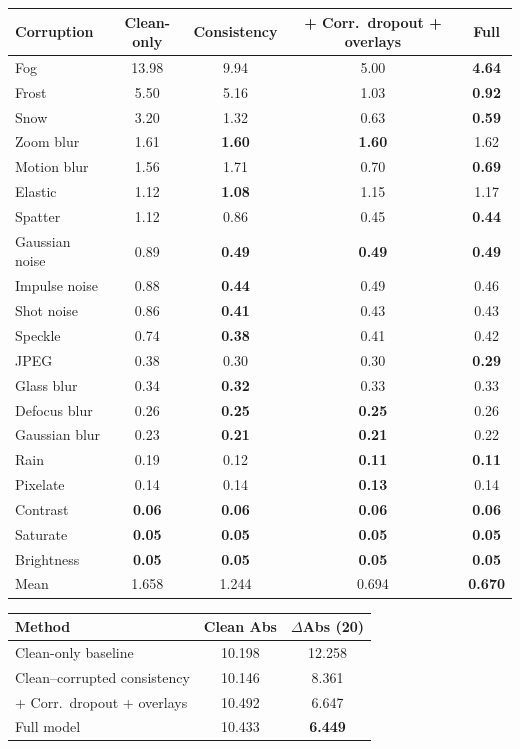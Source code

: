 \begin{tabular}{lcccc}
\toprule
Corruption & Clean-only & Consistency & + Corr.\ dropout + overlays & Full \\
\midrule
Fog & 13.98 & 9.94 & 5.00 & \textbf{4.64} \\
Frost & 5.50 & 5.16 & 1.03 & \textbf{0.92} \\
Snow & 3.20 & 1.32 & 0.63 & \textbf{0.59} \\
Zoom blur & 1.61 & \textbf{1.60} & \textbf{1.60} & 1.62 \\
Motion blur & 1.56 & 1.71 & 0.70 & \textbf{0.69} \\
Elastic & 1.12 & \textbf{1.08} & 1.15 & 1.17 \\
Spatter & 1.12 & 0.86 & 0.45 & \textbf{0.44} \\
Gaussian noise & 0.89 & \textbf{0.49} & \textbf{0.49} & \textbf{0.49} \\
Impulse noise & 0.88 & \textbf{0.44} & 0.49 & 0.46 \\
Shot noise & 0.86 & \textbf{0.41} & 0.43 & 0.43 \\
Speckle & 0.74 & \textbf{0.38} & 0.41 & 0.42 \\
JPEG & 0.38 & 0.30 & 0.30 & \textbf{0.29} \\
Glass blur & 0.34 & \textbf{0.32} & 0.33 & 0.33 \\
Defocus blur & 0.26 & \textbf{0.25} & \textbf{0.25} & 0.26 \\
Gaussian blur & 0.23 & \textbf{0.21} & \textbf{0.21} & 0.22 \\
Rain & 0.19 & 0.12 & \textbf{0.11} & \textbf{0.11} \\
Pixelate & 0.14 & 0.14 & \textbf{0.13} & 0.14 \\
Contrast & \textbf{0.06} & \textbf{0.06} & \textbf{0.06} & \textbf{0.06} \\
Saturate & \textbf{0.05} & \textbf{0.05} & \textbf{0.05} & \textbf{0.05} \\
Brightness & \textbf{0.05} & \textbf{0.05} & \textbf{0.05} & \textbf{0.05} \\
\midrule
Mean & 1.658 & 1.244 & 0.694 & \textbf{0.670} \\
\bottomrule
\end{tabular}

\begin{tabular}{lcc}
\toprule
Method & Clean Abs & $\Delta$Abs (20) \\
\midrule
Clean-only baseline & 10.198 & 12.258 \\
Clean--corrupted consistency & 10.146 & 8.361 \\
+ Corr.\ dropout + overlays & 10.492 & 6.647 \\
Full model & 10.433 & \textbf{6.449} \\
\bottomrule
\end{tabular}
